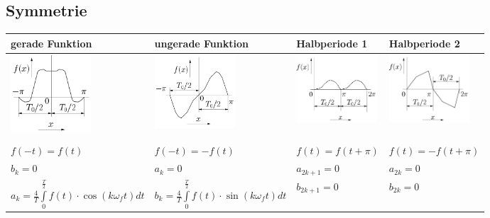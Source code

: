 	\subsection{Symmetrie}
		\begin{tabular}{|p{4.3cm}|p{4.3cm}|p{4.4cm}|p{4.4cm}|}
         	\hline
        	\textbf{gerade Funktion} & \textbf{ungerade Funktion} &
        	\textbf{Halbperiode 1} & \textbf{Halbperiode 2}\\
        	\hline
        	\includegraphics[width=3cm]{Content/Transformationen/gerade_funktion.png}&
        	\includegraphics[width=3cm]{Content/Transformationen/ungerade_funktion.png}&   
 			\includegraphics[width=3cm]{Content/Transformationen/halbperiode_1.png}&   
			\includegraphics[width=3cm]{Content/Transformationen/halbperiode_2.png}\\
			\hline & & & \\			
   			$f(-t)=f(t)$ & $f(-t)=-f(t)$ & $f(t)=f(t+\pi)$ & $f(t)=-f(t+\pi)$\\
   			$b_k=0$ & $a_k=0$ & $a_{2k+1}=0$ & $a_{2k}=0$\\
   			$a_k = \frac{4}{T} \int\limits_0^{\frac{T}{2}} f(t) \cdot \cos(k \omega_f
   			t) dt$ &
   			$b_k =  \frac{4}{T} \int\limits_0^{\frac{T}{2}} f(t) \cdot
			\sin(k \omega_f t) dt$ &
			$b_{2k+1}=0$ & $b_{2k}=0$\\
			\hline
      	\end{tabular} 
     	
